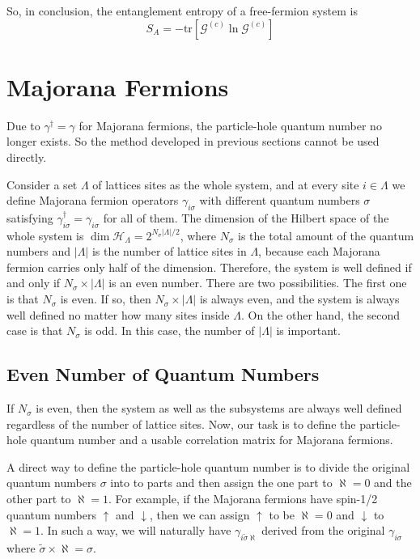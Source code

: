 \documentclass[12font]{article}
\theoremstyle{definition}
\numberwithin{equation}{section}
\newcommand{\lrm}[1]{\left[  #1  \right]}
\newcommand{\abs}[1]{\left|  #1  \right|}
\newcommand{\mrm}[1]{\mathrm{#1}}
\newcommand{\tr}{\mrm{tr}}
\begin{document}
So, in conclusion, the entanglement entropy of a free-fermion system is
\begin{equation}\label{ee-correlation-final}
  S_A = -\tr\lrm{\mathcal{G}^{(c)}\ln\mathcal{G}^{(c)}}
\end{equation}

\section{Majorana Fermions}
Due to $\gamma^\dagger = \gamma$ for Majorana fermions, the particle-hole quantum number no longer exists. So the method developed in previous sections cannot be used directly.

Consider a set $\Lambda$ of lattices sites as the whole system, and at every site $i\in\Lambda$ we define Majorana fermion operators $\gamma_{i\sigma}$ with different quantum numbers $\sigma$ satisfying $\gamma_{i\sigma}^\dagger = \gamma_{i\sigma}$ for all of them. The dimension of the Hilbert space of the whole system is $\dim\mathcal{H}_\Lambda = 2^{N_{\sigma}\abs{\Lambda}/2}$, where $N_{\sigma}$ is the total amount of the quantum numbers and $\abs{\Lambda}$ is the number of lattice sites in $\Lambda$, because each Majorana fermion carries only half of the dimension. Therefore, the system is well defined if and only if $N_{\sigma}\times\abs{\Lambda}$ is an even number. There are two possibilities. The first one is that $N_{\sigma}$ is even. If so, then $N_{\sigma}\times\abs{\Lambda}$ is always even, and the system is always well defined no matter how many sites inside $\Lambda$. On the other hand, the second case is that $N_{\sigma}$ is odd. In this case, the number of $\abs{\Lambda}$ is important.
\subsection{Even Number of Quantum Numbers}
If $N_{\sigma}$ is even, then the system as well as the subsystems are always well defined regardless of the number of lattice sites. Now, our task is to define the particle-hole quantum number and a usable correlation matrix for Majorana fermions. 

A direct way to define the particle-hole quantum number is to divide the original quantum numbers $\sigma$ into to parts and then assign the one part to $\aleph=0$ and the other part to $\aleph=1$. For example, if the Majorana fermions have spin-1/2 quantum numbers $\uparrow$ and $\downarrow$, then we can assign $\uparrow$ to be $\aleph = 0$ and $\downarrow$ to $\aleph=1$. In such a way, we will naturally have $\gamma_{i\tilde{\sigma}\aleph}$ derived from the original $\gamma_{i\sigma}$ where $\tilde{\sigma}\times\aleph = \sigma$. 
\end{document}
